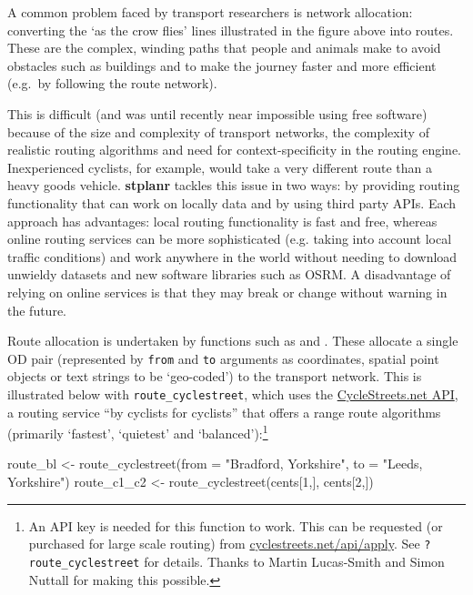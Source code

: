A common problem faced by transport researchers is network allocation:
converting the `as the crow flies' lines illustrated in the figure above
into routes. These are the complex, winding paths that people and
animals make to avoid obstacles such as buildings and to make the
journey faster and more efficient (e.g.~by following the route network).

This is difficult (and was until recently near impossible using free
software) because of the size and complexity of transport networks, the
complexity of realistic routing algorithms and need for
context-specificity in the routing engine. Inexperienced cyclists, for
example, would take a very different route than a heavy goods vehicle.
\textbf{stplanr} tackles this issue in two ways: by providing routing
functionality that can work on locally data and by using third party APIs.
Each approach has advantages: local routing functionality is fast and free,
whereas online routing services can be more sophisticated (e.g. taking
into account local traffic conditions) and work anywhere in the world
without needing to download unwieldy datasets and new software libraries such
as OSRM.
A disadvantage of relying on online services is that they may break or change
without warning in the future.

Route allocation is undertaken by  functions such as
 and \linebreak {}.
These allocate a single OD pair (represented by \texttt{from} and \texttt{to}
arguments as coordinates,
spatial point objects or text strings to be
`geo-coded') to the transport network.
This is illustrated
below with \texttt{route\_cyclestreet}, which uses the
\href{http://www.cyclestreets.net/api/}{CycleStreets.net API}, a routing
service ``by cyclists for cyclists'' that offers a range route
algorithms (primarily `fastest', `quietest' and `balanced'):\footnote{An
API key
  is needed for this function to work. This can be requested (or
  purchased for large scale routing) from
  \href{https://www.cyclestreets.net/api/apply/}{cyclestreets.net/api/apply}.
  See \texttt{?route\_cyclestreet} for details. Thanks to Martin
  Lucas-Smith and Simon Nuttall for making this possible.}

\begin{Schunk}
\begin{Sinput}
route_bl <- route_cyclestreet(from = "Bradford, Yorkshire", to = "Leeds, Yorkshire")
route_c1_c2 <- route_cyclestreet(cents[1,], cents[2,])
\end{Sinput}
\end{Schunk}

